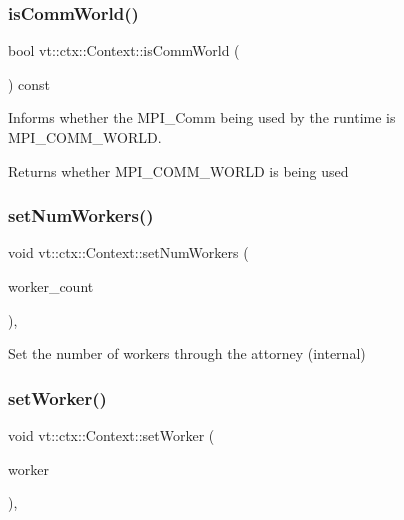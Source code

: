 \subsubsection{\texorpdfstring{is\+Comm\+World()}{isCommWorld()}}
{\footnotesize\ttfamily bool vt\+::ctx\+::\+Context\+::is\+Comm\+World (\begin{DoxyParamCaption}{ }\end{DoxyParamCaption}) const\hspace{0.3cm}{\ttfamily [inline]}}



Informs whether the M\+P\+I\+\_\+\+Comm being used by the runtime is {\ttfamily M\+P\+I\+\_\+\+C\+O\+M\+M\+\_\+\+W\+O\+R\+LD}. 

\begin{DoxyReturn}{Returns}
whether {\ttfamily M\+P\+I\+\_\+\+C\+O\+M\+M\+\_\+\+W\+O\+R\+LD} is being used 
\end{DoxyReturn}
\mbox{\label{structvt_1_1ctx_1_1_context_afc4549ac9cdae67301613613b9381d1c}} 
\subsubsection{\texorpdfstring{set\+Num\+Workers()}{setNumWorkers()}}
{\footnotesize\ttfamily void vt\+::ctx\+::\+Context\+::set\+Num\+Workers (\begin{DoxyParamCaption}\item[{\hyperlink{namespacevt_aa93398ea48f2cb6c188512250f7cc248}{Worker\+Count\+Type} const}]{worker\+\_\+count }\end{DoxyParamCaption})\hspace{0.3cm}{\ttfamily [inline]}, {\ttfamily [protected]}}



Set the number of workers through the attorney (internal) 

\mbox{\label{structvt_1_1ctx_1_1_context_a32f62f26b7a6977c91186f8c2aa2b16a}} 
\subsubsection{\texorpdfstring{set\+Worker()}{setWorker()}}
{\footnotesize\ttfamily void vt\+::ctx\+::\+Context\+::set\+Worker (\begin{DoxyParamCaption}\item[{\hyperlink{namespacevt_a656e362091da17b9b93d0655b36e3392}{Worker\+I\+D\+Type} const}]{worker }\end{DoxyParamCaption})\hspace{0.3cm}{\ttfamily [inline]}, {\ttfamily [protected]}}



